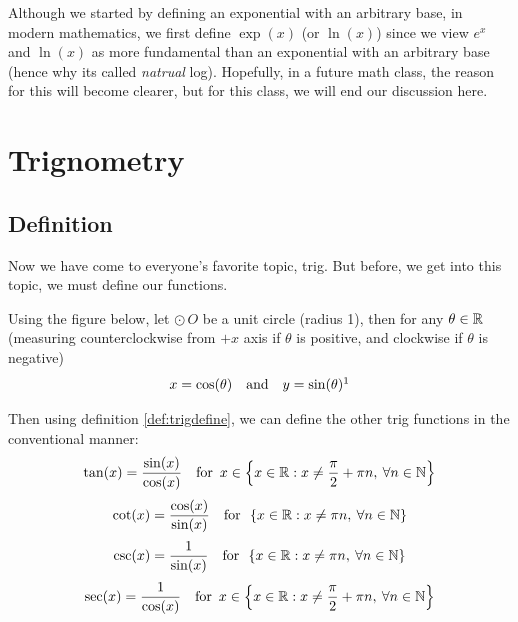 Although we started by defining an exponential with an arbitrary base, in modern mathematics, we first define $\exp(x)$ (or $\ln(x)$) since we view $e^x$ and $\ln(x)$ as more fundamental than an exponential with an arbitrary base (hence why its called \textit{natrual} log). Hopefully, in a future math class, the reason for this will become clearer, but for this class, we will end our discussion here.

\section{Trignometry}
\subsection{Definition}
 Now we have come to everyone's favorite topic, trig. But before, we get into this topic, we must define our functions.
 	\begin{define}
 		\label{def:trigdefine}
		Using the figure below, let $\odot\,O$ be a unit circle (radius 1), then for any $\theta\in\mathbb{R}$ (measuring counterclockwise from $+x$ axis if $\theta$ is positive, and clockwise if $\theta$ is negative)
		$$x=\cos(\theta) \jand y=\sin(\theta)\footnotemark$$
		\begin{center}
	\end{center}
\end{define}


Then using definition \eqref{def:trigdefine}, we can define the other trig functions in the conventional manner:
$$\tan(x)=\frac{\sin(x)}{\cos(x)}
\quad\text{for }\, x\in \left\{x\in\mathbb{R}: x\neq \frac{\pi}{2}+\pi n, \:
\forall n\in\mathbb{N}\right\}$$
$$\cot(x)=\frac{\cos(x)}{\sin(x)}
\quad\text{for }\, \left\{x\in\mathbb{R} :x\neq\pi n, \:
\forall n\in\mathbb{N}\right\}$$
$$\csc(x)=\frac{1}{\sin(x)} \quad\text{for }\, \left\{x\in\mathbb{R} :x\neq\pi n, \:
\forall n\in\mathbb{N}\right\}$$
$$\text{sec}(x)=\frac{1}{\cos(x)}
\quad\text{for }\, x\in \left\{x\in\mathbb{R}: x\neq \frac{\pi}{2}+\pi n, \:
\forall n\in\mathbb{N}\right\}$$

